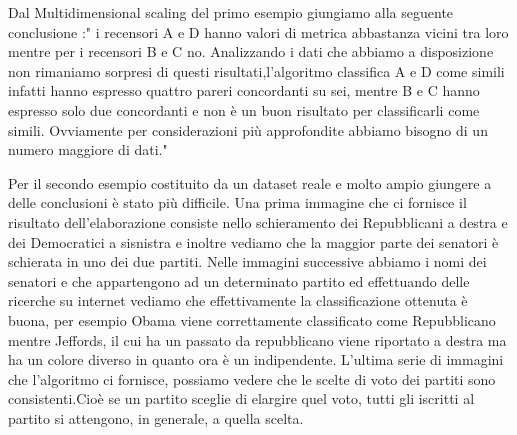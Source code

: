				Dal Multidimensional scaling del primo esempio giungiamo alla seguente conclusione :" i recensori A e D hanno valori di metrica abbastanza vicini tra loro mentre per i recensori B e C no.
				Analizzando i dati che abbiamo a disposizione non rimaniamo sorpresi di questi risultati,l'algoritmo classifica A e D come simili infatti hanno espresso quattro pareri concordanti su sei, mentre B e C hanno espresso solo due concordanti e non è un buon risultato per classificarli come simili.
				Ovviamente per considerazioni più approfondite abbiamo bisogno di un numero maggiore di dati."
				
				Per il secondo esempio costituito da un dataset reale e molto ampio giungere a delle conclusioni è stato più difficile.
				Una prima immagine che ci fornisce il risultato dell'elaborazione consiste nello schieramento dei Repubblicani a destra e dei Democratici a sisnistra e inoltre vediamo che la maggior parte dei senatori è schierata in uno dei due partiti.
				Nelle immagini successive abbiamo i nomi dei senatori e che appartengono ad un determinato partito ed effettuando delle ricerche su internet vediamo che effettivamente la classificazione ottenuta è buona, per esempio Obama viene correttamente classificato come Repubblicano mentre Jeffords, il cui ha un passato da repubblicano viene riportato a destra ma ha un colore diverso in quanto ora è un indipendente.
				L'ultima serie di immagini che l'algoritmo ci fornisce, possiamo vedere che le scelte di voto dei partiti sono consistenti.Cioè se un partito sceglie di elargire quel voto, tutti gli iscritti al partito si attengono, in generale, a quella scelta.
